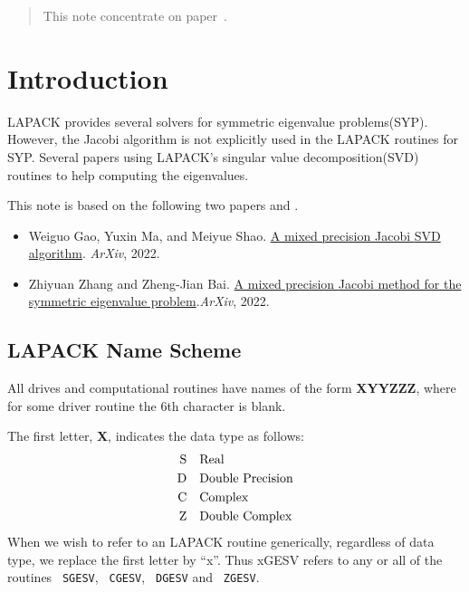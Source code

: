 \documentclass{article}
\renewcommand{\bf}[1]{\textsf{\bfseries \color{purple} #1}}
\newcommand{\code}[1]{\texttt{\color{green!30!black} #1}}
\begin{document}
\maketitle
\thispagestyle{firstpage} 


\begin{abstract}
    This note concentrate on
    paper~\cite{gms22,zhba22}. 
\end{abstract}

\section{Introduction}
LAPACK provides several solvers for symmetric eigenvalue problems(SYP). 
However, the Jacobi algorithm is not explicitly used in the LAPACK 
routines for SYP. 
Several papers using LAPACK's singular value decomposition(SVD) routines
to help computing the eigenvalues. 

This note is based on the following two papers
\cite{gms22} and \cite{zhba22}.

\begin{itemize}[nosep]
    \item Weiguo Gao, Yuxin Ma, and Meiyue Shao.
    \href{https://arxiv.org/abs/2209.04626}{A mixed precision
    {Jacobi} {SVD} algorithm}. {\em ArXiv}, 2022.
    \item Zhiyuan Zhang and Zheng-Jian Bai.
    \href{https://arxiv.org/abs/2211.03339}{A mixed precision {Jacobi}
      method for the symmetric eigenvalue problem}.{\em ArXiv}, 2022.
  \end{itemize}

\subsection{LAPACK Name Scheme}
All drives and computational routines have names of the form 
\bf{XYYZZZ}, where for some driver routine the 6th character is blank.

The first letter, \bf{X}, indicates the data type as follows:
\begin{equation}\notag
    \begin{aligned}
        \text{S} \quad & \text{Real} \\
        \text{D} \quad & \text{Double Precision} \\ 
        \text{C} \quad & \text{Complex} \\ 
        \text{Z} \quad & \text{Double Complex}
    \end{aligned}
\end{equation}
When we wish to refer to an LAPACK routine generically, regardless of
data type, we replace the first letter by ``x''. Thus xGESV refers to
any or all of the routines \code{SGESV}, \code{CGESV}, \code{DGESV} and
\code{ZGESV}.
\end{document}
